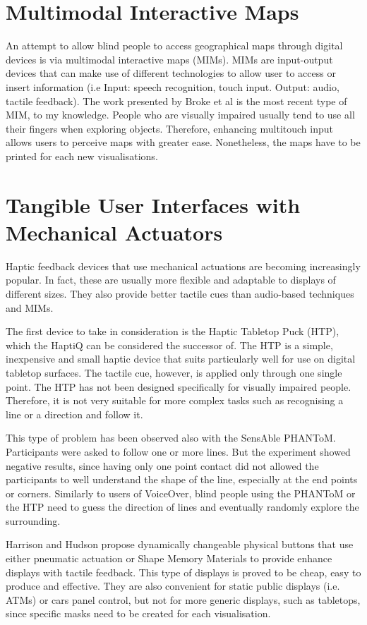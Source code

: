 \section{Multimodal Interactive Maps}
An attempt to allow blind people to access geographical maps through digital devices is via multimodal interactive maps (MIMs). MIMs are input-output devices that can make use of different technologies to allow user to access or insert information (i.e Input: speech recognition, touch input. Output: audio, tactile feedback). The work presented by Broke et al \cite{brock2010usage} is the most recent type of MIM, to my knowledge. People who are visually impaired usually tend to use all their fingers when exploring objects. Therefore, enhancing multitouch input allows users to perceive maps with greater ease. Nonetheless, the maps have to be printed for each new visualisations. 

\section{Tangible User Interfaces with Mechanical Actuators}
Haptic feedback devices that use mechanical actuations are becoming increasingly popular. In fact, these are usually more flexible and adaptable to displays of different sizes. They also provide better tactile cues than audio-based techniques and MIMs.

The first device to take in consideration is the Haptic Tabletop Puck (HTP)\cite{marquardt2009haptic}, which the HaptiQ can be considered the successor of. The HTP is a simple, inexpensive and small haptic device that suits particularly well for use on digital tabletop surfaces. The tactile cue, however, is applied only through one single point. The HTP has not been designed specifically for visually impaired people. Therefore, it is not very suitable for more complex tasks such as recognising a line or a direction and follow it. 

This type of problem has been observed also with the SensAble PHANToM\cite{massie1994phantom, yu2001haptic}. Participants were asked to follow one or more lines. But the experiment showed negative results, since having only one point contact did not allowed the participants to well understand the shape of the line, especially at the end points or corners. Similarly to users of VoiceOver, blind people using the PHANToM or the HTP need to guess the direction of lines and eventually randomly explore the surrounding. 

Harrison and Hudson \cite{harrison2009providing} propose dynamically changeable physical buttons that use either pneumatic actuation or Shape Memory Materials to provide enhance displays with tactile feedback. This type of displays is proved to be cheap, easy to produce and effective. They are also convenient for static public displays (i.e. ATMs) or cars panel control, but not for more generic displays, such as tabletops, since specific masks need to be created for each visualisation. 

